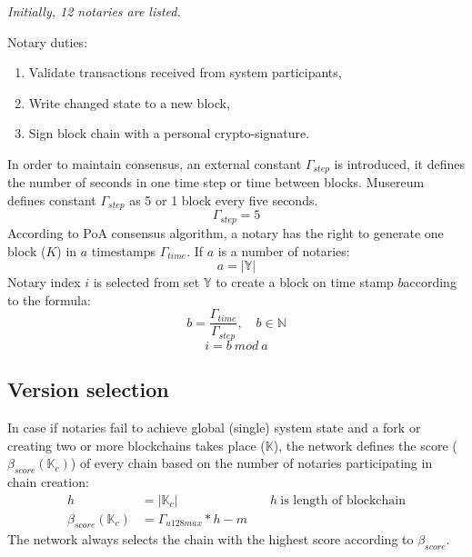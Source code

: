 \documentclass[12pt]{report}
\newcommand{\hlc}[1]{\colorbox{white!25}{#1}}
\begin{document}
\textit{Initially, 12 notaries are listed.}

Notary \hlc{duties}: 
\begin{enumerate}
\item Validate transactions received from system participants,
\item \hlc{Write changed state to a new block},
\item \hlc{Sign block chain} with a personal crypto-signature.
\end{enumerate}

In order to maintain consensus, an external constant $\Gamma_{step}$ is introduced, it defines the number of seconds in one time step or time between blocks. Musereum defines constant $\Gamma_{step}$ as 5 or 1 block every five seconds.
\begin{equation}
\Gamma_{step} = 5
\end{equation}
According to PoA consensus algorithm, a notary has the right to generate one block ($K$) in $a$ \hlc{timestamps} $\Gamma_{time}$. If $a$ is a number of notaries:
\begin{equation}
a = |\mathbb{Y}|
\end{equation}
Notary index $i$ is selected from set $\mathbb{Y}$ to create a block on time stamp $b$according to the formula: 
\begin{equation}
b = \frac{\Gamma_{time}}{\Gamma_{step}},  \quad b \in \mathbb{N} 
\end{equation}
\begin{equation}
i = b \ mod \ a
\end{equation}
\subsection{Version selection}
\label{tech-blockchain-score}
In case if notaries fail to achieve global (single) system state and a fork or creating two or more blockchains takes place ($\mathbb{K}$), the network defines the score ($\beta_{score}(\mathbb{K}_c)$) of every  chain based on the number of notaries participating in \hlc{chain creation}:	
\begin{align}
h &= |\mathbb{K}_c| & \quad h \ \text{is length of blockchain} \\
\beta_{score}(\mathbb{K}_c) &= \Gamma_{u128max} * h - m
\end{align}
The network always selects the chain with the highest score according to $\beta_{score}$.
\end{document}
